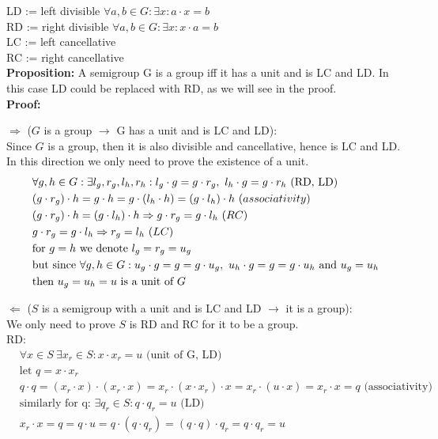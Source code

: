 \documentclass[a4paper]{article}
\begin{document}
\thispagestyle{fancy} %
{}

LD := left divisible $\forall a, b \in G: \exists x: a\cdot x = b$\\
RD := right divisible $\forall a, b \in G: \exists x: x\cdot a = b$\\
LC := left cancellative\\
RC := right cancellative\\

\textbf{Proposition:} A semigroup G is a group iff it has a unit and is LC and LD. In this case LD could be replaced with RD, as we will see in the proof. \\

\textbf{Proof:}

$\Rightarrow$ ($G$ is a group $\rightarrow$ G has a unit and is LC and LD):\\
Since $G$ is a group, then it is also divisible and cancellative, hence is LC and LD. In this direction we only need to prove the existence of a unit.
\begin{align*}
 & \forall g,h \in G: \exists l_g, r_g, l_h, r_h: l_g \cdot g = g \cdot r_g,\ l_h \cdot g = g \cdot r_h \text{ (RD, LD)}\\
 & (g\cdot r_g) \cdot h = g\cdot h = g \cdot (l_h \cdot h) = (g \cdot l_h) \cdot h \ \text(associativity)\\
 & (g\cdot r_g) \cdot h = (g\cdot l_h) \cdot h \Rightarrow g\cdot r_g = g\cdot l_h\ \text(RC) \\
 & g\cdot r_g = g\cdot l_h \Rightarrow r_g = l_h\ \text(LC) \\
 & \text{for } g = h \text{ we denote } l_g = r_g = u_g \\
 & \text{but since } \forall g,h \in G: u_g \cdot g = g = g \cdot u_g,\ u_h \cdot g = g = g \cdot u_h \text{ and } u_g = u_h \\
 & \text{then } u_g = u_h = u \text{ is a unit of } G
\end{align*}

$\Leftarrow$ ($S$ is a semigroup with a unit and is LC and LD $\rightarrow$ it is a group):\\
We only need to prove $S$ is RD and RC for it to be a group.\\

RD:
\begin{align*}
 & \forall x \in S\ \exists x_r \in S: x\cdot x_r = u \text{ (unit of G, LD)} \\
 & \text{let } q = x\cdot x_r \\
 & q\cdot q = (x_r\cdot x)\cdot(x_r\cdot x) = x_r\cdot (x\cdot x_r)\cdot x = x_r\cdot (u \cdot x) = x_r\cdot x = q \text{ (associativity)} \\
 & \text{similarly for q: } \exists q_r\in S: q\cdot q_r = u \text{ (LD)}  \\
 & x_r \cdot x = q = q\cdot u = q \cdot (q \cdot q_r)  = (q \cdot q)\cdot q_r = q \cdot q_r = u
\end{align*}
\end{document}
